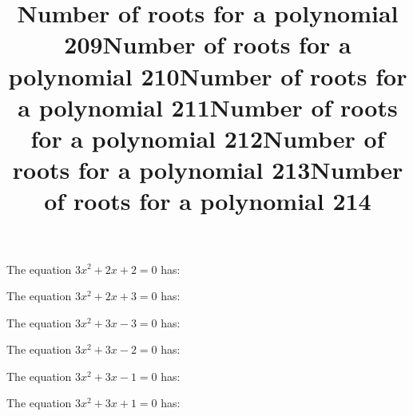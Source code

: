 \documentclass{article}
\begin{document}
\begin{category}
\begin{question}[multichoice]

\end{question}
\begin{question}[multichoice]
\title{Number of roots for a polynomial 209}
The equation $3 x^{2} + 2 x + 2=0$ has:


\end{question}
\begin{question}[multichoice]
\title{Number of roots for a polynomial 210}
The equation $3 x^{2} + 2 x + 3=0$ has:


\end{question}
\begin{question}[multichoice]
\title{Number of roots for a polynomial 211}
The equation $3 x^{2} + 3 x - 3=0$ has:


\end{question}
\begin{question}[multichoice]
\title{Number of roots for a polynomial 212}
The equation $3 x^{2} + 3 x - 2=0$ has:


\end{question}
\begin{question}[multichoice]
\title{Number of roots for a polynomial 213}
The equation $3 x^{2} + 3 x - 1=0$ has:


\end{question}
\begin{question}[multichoice]
\title{Number of roots for a polynomial 214}
The equation $3 x^{2} + 3 x + 1=0$ has:



\end{question}
\end{category}
\end{document}
